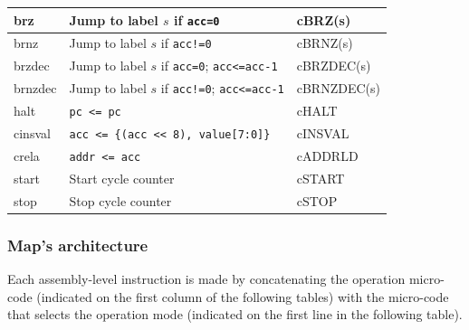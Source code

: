 \begin{table}[H]
\begin{longtable}{|l|l|l|}
brz            & Jump to label \(s\) if \texttt{acc=0}         & cBRZ(s)      \\ \hline
brnz           & Jump to label \(s\) if \texttt{acc!=0}        & cBRNZ(s)     \\ \hline
brzdec         & Jump to label \(s\) if \texttt{acc=0}; \texttt{acc<=acc-1} & cBRZDEC(s)   \\ \hline
brnzdec        & Jump to label \(s\) if \texttt{acc!=0}; \texttt{acc<=acc-1} & cBRNZDEC(s)  \\ \hline
halt           & \texttt{pc <= pc}                            & cHALT        \\ \hline
cinsval        & \texttt{acc <= \{(acc << 8), value[7:0]\}}    & cINSVAL      \\ \hline
crela          & \texttt{addr <= acc}                         & cADDRLD      \\ \hline
start          & Start cycle counter                          & cSTART       \\ \hline
stop           & Stop cycle counter                           & cSTOP        \\ \hline
\end{longtable}
\end{table}



\subsubsection{Map's architecture}

Each assembly-level instruction is made by concatenating the operation micro-code (indicated on the first column of the following tables) with the micro-code that selects the operation mode (indicated on the first line in the following table).

